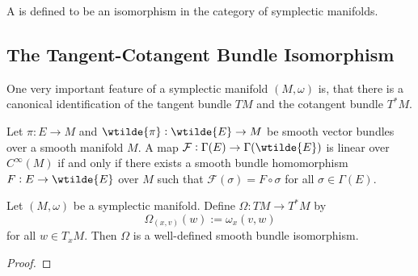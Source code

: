 \begin{definition}[Symplectomorphism]
	A  is defined to be an isomorphism in the category of symplectic manifolds.
\end{definition}

\subsection*{The Tangent-Cotangent Bundle Isomorphism}
One very important feature of a symplectic manifold $(M,\omega)$ is, that there is a canonical identification of the tangent bundle $TM$ and the cotangent bundle $T^*M$. 



\begin{theorem}
	\label{thm:bundle_homomorphism_characterisation_lemma}
	Let $\pi : E \to M$ and $\wtilde{\pi} : \wtilde{E} \to M$ be smooth vector bundles over a smooth manifold $M$. A map $\mathcal{F} : \Gamma(E) \to \Gamma(\wtilde{E})$ is linear over $C^\infty(M)$ if and only if there exists a smooth bundle homomorphism $F : E \to \wtilde{E}$ over $M$ such that $\mathcal{F}(\sigma) = F \circ \sigma$ for all $\sigma \in \Gamma(E)$.
\end{theorem}

\begin{proposition}
	\label{prop:tangent-cotangent_bundle_isomorphism}
	Let $(M,\omega)$ be a symplectic manifold. Define $\Omega : TM \to T^*M$ by
	\begin{equation}
		\Omega_{(x,v)}(w) := \omega_x(v,w)
	\end{equation}
	\noindent for all $w \in T_xM$. Then $\Omega$ is a well-defined smooth bundle isomorphism.
\end{proposition}

\begin{proof}
	
\end{proof}
